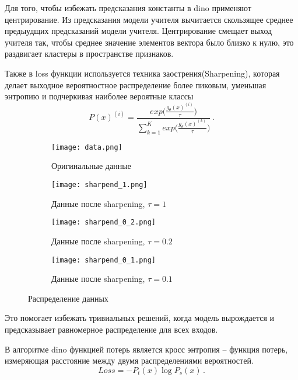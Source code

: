 \documentclass[../part_1.tex]{subfiles}
\begin{document}
    \par Для того, чтобы избежать предсказания константы в \acrshort{dino} применяют центрирование. Из предсказания модели учителя вычитается скользящее среднее предыудщих предсказаний модели учителя. Центрирование смещает выход учителя так, чтобы среднее значение элементов вектора было близко к нулю, это раздвигает кластеры в пространстве признаков.
    \par Также в loss функции используется техника заострения(Sharpening), которая делает выходное вероятностное распределение более пиковым, уменьшая энтропию и подчеркивая наиболее вероятные классы
    \begin{equation}
        \label{sharpening}
        P(x)^{(i)} = \frac{\displaystyle exp\Bigg(\frac{g_\theta(x)^{(i)}}{\tau}\Bigg)}{\displaystyle \sum^K_{k=1}exp\Bigg(\frac{g_\theta(x)^{(k)}}{\tau}\Bigg)}\,.
    \end{equation}

    \begin{figure}[htbp]
        \centering
        \begin{subfigure}{.49\textwidth}
            \centering
            \texttt{[image: data.png]}  
            \caption{Оригинальные данные}
        \end{subfigure}
        \hfill
        \begin{subfigure}{.49\textwidth}
            \centering
            \texttt{[image: sharpend\_1.png]}  
            \caption{Данные после sharpening, $\tau = 1$}
        \end{subfigure}
        \vspace{1cm}
        \begin{subfigure}{.49\textwidth}
            \centering
            \texttt{[image: sharpend\_0\_2.png]}  
            \caption{Данные после sharpening, $\tau = 0.2$}
        \end{subfigure}
        \hfill
        \begin{subfigure}{.49\textwidth}
            \centering
            \texttt{[image: sharpend\_0\_1.png]}  
            \caption{Данные после sharpening, $\tau = 0.1$}
        \end{subfigure}
        \caption{Распределение данных}
    \end{figure}

    \par Это помогает избежать тривиальных решений, когда модель вырождается  и предсказывает равномерное распределение для всех входов.
    \par В алгоритме \acrshort{dino} функцией потерь является кросс энтропия -- функция потерь, измеряющая расстояние между двумя распределениями вероятностей.
    \begin{equation}
        \label{cross_entropy}
        Loss = -P_t(x) \log P_s(x)\,.
    \end{equation}
\end{document}
